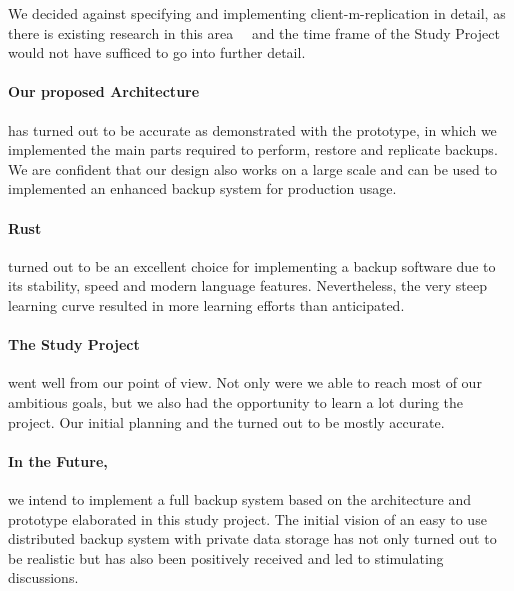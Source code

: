 We decided against specifying and implementing \gls{client-m-replication} in detail, as there is existing research in this area~\cite{p2p-redundancy}~\cite{p2p-scheduling} and the time frame of the Study Project would not have sufficed to go into further detail.

\paragraph{Our proposed Architecture}
has turned out to be accurate as demonstrated with the prototype, in which we implemented the main parts required to perform, restore and replicate backups. We are confident that our design also works on a large scale and can be used to implemented an enhanced backup system for production usage.

\paragraph{Rust}
turned out to be an excellent choice for implementing a backup software due to its stability, speed and modern language features.
Nevertheless, the very steep learning curve resulted in more learning efforts than anticipated.

\paragraph{The Study Project}
went well from our point of view. Not only were we able to reach most of our ambitious goals, but we also had the opportunity to learn a lot during the project. Our initial planning and the  turned out to be mostly accurate.

\paragraph{In the Future,}
we intend to implement a full backup system based on the architecture and prototype elaborated in this study project. The initial vision of an easy to use distributed backup system with private data storage has not only turned out to be realistic but has also been positively received and led to stimulating discussions.
